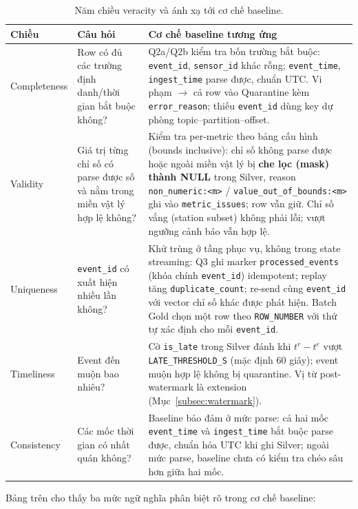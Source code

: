 \begin{table}[H]
\centering
\caption{Năm chiều veracity và ánh xạ tới cơ chế baseline.}
\label{tab:veracity-mapping}
\small
\begin{tabularx}{\textwidth}{l X X}
\toprule
\textbf{Chiều} & \textbf{Câu hỏi} & \textbf{Cơ chế baseline tương ứng} \\
\midrule
Completeness & Row có đủ các trường định danh/thời gian bắt buộc không? &
  Q2a/Q2b kiểm tra bốn trường bắt buộc: \texttt{event\_id},
  \texttt{sensor\_id} khác rỗng; \texttt{event\_time},
  \texttt{ingest\_time} parse được, chuẩn UTC. Vi phạm $\rightarrow$ cả
  row vào Quarantine kèm \texttt{error\_reason}; thiếu
  \texttt{event\_id} dùng key dự phòng topic--partition--offset. \\
Validity & Giá trị từng chỉ số có parse được số và nằm trong miền vật lý
  hợp lệ không? &
  Kiểm tra per-metric theo bảng cấu hình (bounds inclusive): chỉ số
  không parse được hoặc ngoài miền vật lý bị \textbf{che lọc (mask)
  thành NULL} trong Silver, reason \texttt{non\_numeric:<m>} /
  \texttt{value\_out\_of\_bounds:<m>} ghi vào \texttt{metric\_issues};
  row vẫn giữ. Chỉ số vắng (station subset) không phải lỗi; vượt ngưỡng
  cảnh báo vẫn hợp lệ. \\
Uniqueness & \texttt{event\_id} có xuất hiện nhiều lần không? &
  Khử trùng ở tầng phục vụ, không trong state streaming: Q3 ghi marker
  \texttt{processed\_events} (khóa chính \texttt{event\_id}) idempotent;
  replay tăng \texttt{duplicate\_count}; re-send cùng \texttt{event\_id}
  với vector chỉ số khác được phát hiện. Batch Gold chọn một row theo
  \texttt{ROW\_NUMBER} với thứ tự xác định cho mỗi \texttt{event\_id}. \\
Timeliness & Event đến muộn bao nhiêu? &
  Cờ \texttt{is\_late} trong Silver đánh khi $t^{r} - t^{e}$ vượt
  \texttt{LATE\_THRESHOLD\_S} (mặc định 60 giây); event muộn hợp lệ
  không bị quarantine. Vị từ post-watermark là extension
  (Mục~\ref{subsec:watermark}). \\
Consistency & Các mốc thời gian có nhất quán không? &
  Baseline bảo đảm ở mức parse: cả hai mốc \texttt{event\_time} và
  \texttt{ingest\_time} bắt buộc parse được, chuẩn hóa UTC khi ghi
  Silver; ngoài mức parse, baseline chưa có kiểm tra chéo sâu hơn giữa
  hai mốc. \\
\bottomrule
\end{tabularx}
\end{table}

Bảng trên cho thấy ba mức ngữ nghĩa phân biệt rõ trong cơ chế baseline:

